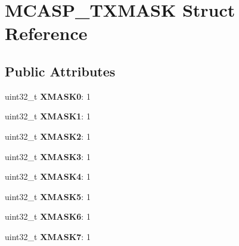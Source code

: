 \hypertarget{structMCASP__TXMASK}{\section{M\-C\-A\-S\-P\-\_\-\-T\-X\-M\-A\-S\-K Struct Reference}
\label{structMCASP__TXMASK}
}
\subsection*{Public Attributes}
\begin{DoxyCompactItemize}
\item 
\hypertarget{structMCASP__TXMASK_ac701b8e1cb96f8a1effa3bf29cec7f4a}{uint32\-\_\-t {\bfseries X\-M\-A\-S\-K0}\-: 1}\label{structMCASP__TXMASK_ac701b8e1cb96f8a1effa3bf29cec7f4a}

\item 
\hypertarget{structMCASP__TXMASK_a69b2d11c4b912ba356638c65754d19fe}{uint32\-\_\-t {\bfseries X\-M\-A\-S\-K1}\-: 1}\label{structMCASP__TXMASK_a69b2d11c4b912ba356638c65754d19fe}

\item 
\hypertarget{structMCASP__TXMASK_a2e3a632584ec2da20a16c78e93960b9e}{uint32\-\_\-t {\bfseries X\-M\-A\-S\-K2}\-: 1}\label{structMCASP__TXMASK_a2e3a632584ec2da20a16c78e93960b9e}

\item 
\hypertarget{structMCASP__TXMASK_a21a74bf678324f166927d9754c331aac}{uint32\-\_\-t {\bfseries X\-M\-A\-S\-K3}\-: 1}\label{structMCASP__TXMASK_a21a74bf678324f166927d9754c331aac}

\item 
\hypertarget{structMCASP__TXMASK_a15714a1352573a006c3121847305762c}{uint32\-\_\-t {\bfseries X\-M\-A\-S\-K4}\-: 1}\label{structMCASP__TXMASK_a15714a1352573a006c3121847305762c}

\item 
\hypertarget{structMCASP__TXMASK_a18a26ee7c64de52b96237ebb091f1cda}{uint32\-\_\-t {\bfseries X\-M\-A\-S\-K5}\-: 1}\label{structMCASP__TXMASK_a18a26ee7c64de52b96237ebb091f1cda}

\item 
\hypertarget{structMCASP__TXMASK_a3177404c7f8bd68d532538216e1ac5af}{uint32\-\_\-t {\bfseries X\-M\-A\-S\-K6}\-: 1}\label{structMCASP__TXMASK_a3177404c7f8bd68d532538216e1ac5af}

\item 
\hypertarget{structMCASP__TXMASK_a5184295b0eca607c4f0a1437ef0d9392}{uint32\-\_\-t {\bfseries X\-M\-A\-S\-K7}\-: 1}\label{structMCASP__TXMASK_a5184295b0eca607c4f0a1437ef0d9392}


\end{DoxyCompactItemize}
